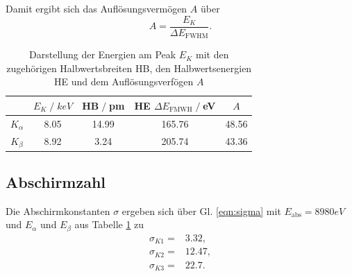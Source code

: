 Damit ergibt sich das Auflösungsvermögen $A$ über
\begin{equation}
    A=\frac{E_K}{\Delta E_{\text{FWHM}}}.
\end{equation}
\begin{table}[H]
    \centering
    \begin{tabular}{c | c c c c}
        \toprule
        & $E_K\;/\;\si{keV}$ & HB$\;/\;$pm & HE $\Delta E_{\text{FMWH}}\;/\;$eV&$A$\\
        \midrule
        $K_{\alpha}$ & 8.05 & 14.99 & 165.76 &48.56\\
        $K_{\beta}$  & 8.92 & 3.24  & 205.74 &43.36\\
        \bottomrule
    \end{tabular}
    \caption{Darstellung der Energien am Peak $E_K$ mit den zugehörigen Halbwertsbreiten
    HB, den Halbwertsenergien HE und dem Auflösungsverfögen $A$}
    \label{tab:tabelle1}
\end{table}
\subsection{Abschirmzahl}
Die Abschirmkonstanten $\sigma$ ergeben sich über Gl. \ref{eqn:sigma} mit $E_{\text{abs}}=8980\si{eV}$\cite{anleitung}
und $E_{\alpha}$ und $E_{\beta}$ aus Tabelle \ref{tab:tabelle1} zu
\begin{align*}
    \sigma_{K1}=&3.32,\\
    \sigma_{K2}=&12.47,\\
    \sigma_{K3}=&22.7.\\
\end{align*}

